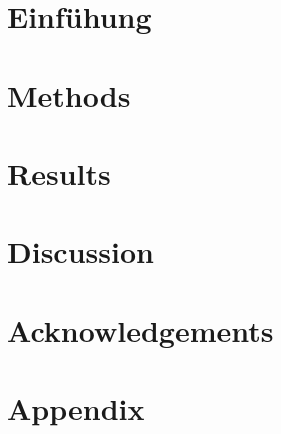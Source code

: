 \documentclass[12pt, a4paper, twoside]{report}
\title{}
\author{}
\date{\today}
\begin{document}
 



 
\tableofcontents

\listoffigures

\listoftables


\chapter{Einfühung}


\chapter{Methods}


\chapter{Results}


\chapter{Discussion}


\chapter{Acknowledgements}


\appendix
\chapter{Appendix}


\printbibliography
\end{document}
